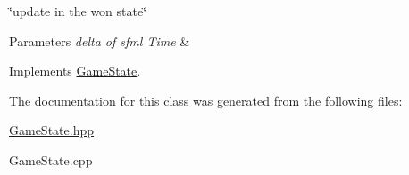 \char`\"{}update in the won state\char`\"{} 


\begin{DoxyParams}{Parameters}
{\em delta of sfml Time} & \\
\hline
\end{DoxyParams}


Implements \hyperlink{classGameState_ab1fe4312f7ce88e7dc11f9935dee67d1}{Game\+State}.



The documentation for this class was generated from the following files\+:\begin{DoxyCompactItemize}
\item 
\hyperlink{GameState_8hpp}{Game\+State.\+hpp}\item 
Game\+State.\+cpp\end{DoxyCompactItemize}
